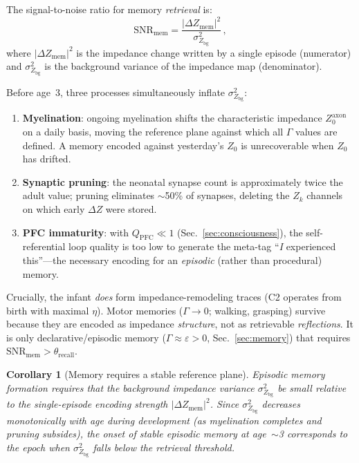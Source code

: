 \documentclass[aps,pre,twocolumn,superscriptaddress,floatfix]{revtex4-2}
\newtheorem{corollary}{Corollary}
\begin{document}
The signal-to-noise ratio for memory \emph{retrieval}
is:
\begin{equation}
  \mathrm{SNR}_{\text{mem}} =
    \frac{|\Delta Z_{\text{mem}}|^2}
         {\sigma^2_{Z_{\text{bg}}}}\,,
  \label{eq:SNR-mem}
\end{equation}
where
$|\Delta Z_{\text{mem}}|^2$ is the impedance change
written by a single episode (numerator) and
$\sigma^2_{Z_{\text{bg}}}$ is the background variance of
the impedance map (denominator).

Before age~3, three processes simultaneously inflate
$\sigma^2_{Z_{\text{bg}}}$:
\begin{enumerate}
  \item \textbf{Myelination}: ongoing myelination
    shifts the characteristic impedance
    $Z_0^{\text{axon}}$ on a daily basis,
    moving the reference plane against which all
    $\Gamma$ values are defined.
    A memory encoded against yesterday's $Z_0$ is
    unrecoverable when $Z_0$ has drifted.
  \item \textbf{Synaptic pruning}: the neonatal synapse
    count is approximately twice the adult value;
    pruning eliminates $\sim$50\% of synapses,
    deleting the $Z_k$ channels on which early
    $\Delta Z$ were stored.
  \item \textbf{PFC immaturity}: with $Q_{\text{PFC}}\ll 1$
    (Sec.~\ref{sec:consciousness}), the self-referential
    loop quality is too low to generate the meta-tag
    ``\emph{I} experienced this''---the necessary encoding
    for an \emph{episodic} (rather than procedural) memory.
\end{enumerate}

Crucially, the infant \emph{does} form impedance-remodeling traces
(C2 operates from birth with maximal $\eta$).
Motor memories ($\Gamma\to 0$; walking, grasping) survive
because they are encoded as impedance \emph{structure},
not as retrievable \emph{reflections}.
It is only declarative/episodic memory
($\Gamma\approx\varepsilon>0$, Sec.~\ref{sec:memory})
that requires $\mathrm{SNR}_{\text{mem}}>\theta_{\text{recall}}$.

\begin{corollary}[Memory requires a stable reference plane]
Episodic memory formation requires that the background
impedance variance $\sigma^2_{Z_{\text{bg}}}$ be small
relative to the single-episode encoding strength
$|\Delta Z_{\text{mem}}|^2$.
Since $\sigma^2_{Z_{\text{bg}}}$ decreases monotonically
with age during development (as myelination completes and
pruning subsides), the onset of stable episodic memory
at age~$\sim$3 corresponds to the epoch when
$\sigma^2_{Z_{\text{bg}}}$ falls below the retrieval
threshold.
\end{corollary}
\end{document}
